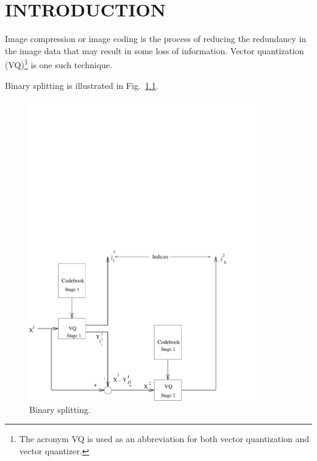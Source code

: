 %
%
%
%

\chapter{INTRODUCTION}
\thispagestyle{empty}

Image compression or image coding is the process of reducing the
redundancy in the image data that may result in some loss of
information.  Vector quantization (VQ)\footnote{The acronym VQ is used
  as an abbreviation for both vector quantization and vector
  quantizer.} is one such technique.

Binary splitting is illustrated in Fig.~\ref{fig:split}.

\begin{figure}[htbp]
\centering
\includegraphics[width=0.9\textwidth]{samplefig}
\caption{Binary splitting.}
\label{fig:split}
\end{figure}

